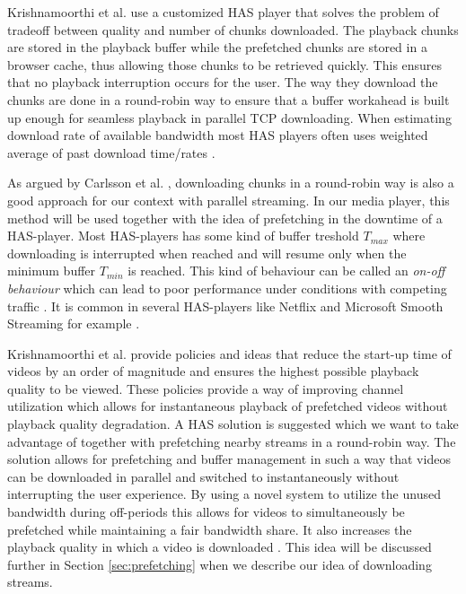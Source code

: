 Krishnamoorthi et al. \cite{qualbranch} use a customized HAS player that solves the problem of tradeoff between quality and number of chunks downloaded. The playback chunks are stored in the playback buffer while the prefetched chunks are stored in a browser cache, thus allowing those chunks to be retrieved quickly. This ensures that no playback interruption occurs for the user. The way they download the chunks are done in a round-robin way to ensure that a buffer workahead is built up enough for seamless playback in parallel TCP downloading. When estimating download rate of available bandwidth most HAS players often uses weighted average of past download time/rates \cite{qualbranch}. 

As argued by Carlsson et al. \cite{optimizedstreaming}, downloading chunks in a round-robin way is also a good approach for our context with parallel streaming. In our media player, this method will be used together with the idea of prefetching in the downtime of a HAS-player. Most HAS-players has some kind of buffer treshold $T_{max}$ where downloading is interrupted when reached and will resume only when the minimum buffer $T_{min}$ is reached. This kind of behaviour can be called an \textit{on-off behaviour} which can lead to poor performance under conditions with competing traffic \cite{bandawarePrefetch,whathappens}. It is common in several HAS-players like Netflix and Microsoft Smooth Streaming for example \cite{bandawarePrefetch}. 

Krishnamoorthi et al. \cite{bandawarePrefetch} provide policies and ideas that reduce the start-up time of videos by an order of magnitude and ensures the highest possible playback quality to be viewed. These policies provide a way of improving channel utilization which allows for instantaneous playback of prefetched videos without playback quality degradation. A HAS solution is suggested which we want to take advantage of together with prefetching nearby streams in a round-robin way. The solution allows for prefetching and buffer management in such a way that videos can be downloaded in parallel and switched to instantaneously without interrupting the user experience. By using a novel system to utilize the unused bandwidth during off-periods this allows for videos to simultaneously be prefetched while maintaining a fair bandwidth share. It also increases the playback quality in which a video is downloaded \cite{bandawarePrefetch}. This idea will be discussed further in Section \ref{sec:prefetching} when we describe our idea of downloading streams.

